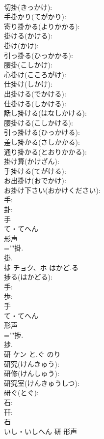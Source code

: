 \documentclass[8pt]{extreport}
\begin{document}
\begin{CJK}{UTF8}{min}
\\	切掛(きっかけ): 
\\	手掛かり(てがかり): 
\\	寄り掛かる(よりかかる): 
\\	掛ける(かける): 
\\	掛け(かけ): 
\\	引っ掛る(ひっかかる): 
\\	腰掛(こしかけ): 
\\	心掛け(こころがけ): 
\\	仕掛け(しかけ): 
\\	出掛ける(でかける): 
\\	仕掛ける(しかける): 
\\	話し掛ける(はなしかける): 
\\	腰掛ける(こしかける): 
\\	引っ掛ける(ひっかける): 
\\	差し掛かる(さしかかる): 
\\	通り掛かる(とおりかかる): 
\\	掛け算(かけざん): 
\\	手掛ける(てがける): 
\\	お出掛け(おでかけ): 
\\	お掛け下さい(おかけください): 
\\	手: 
\\	卦: 
\\	手	
\\	て・てへん	
\\	形声 
\\	=""掛.
\\	掛.
\\	捗	チョク、ホ	はかど.る		
\\	捗る(はかどる): 
\\	手: 
\\	歩: 
\\	手	
\\	て・てへん	
\\	形声 
\\	=""捗.
\\	捗.
\\	研	ケン	と.ぐ	のり	
\\	研究(けんきゅう): 
\\	研修(けんしゅう): 
\\	研究室(けんきゅうしつ): 
\\	研ぐ(とぐ): 
\\	石: 
\\	幵: 
\\	石	
\\	いし・いしへん	硏	形声 

\end{CJK}
\end{document}

